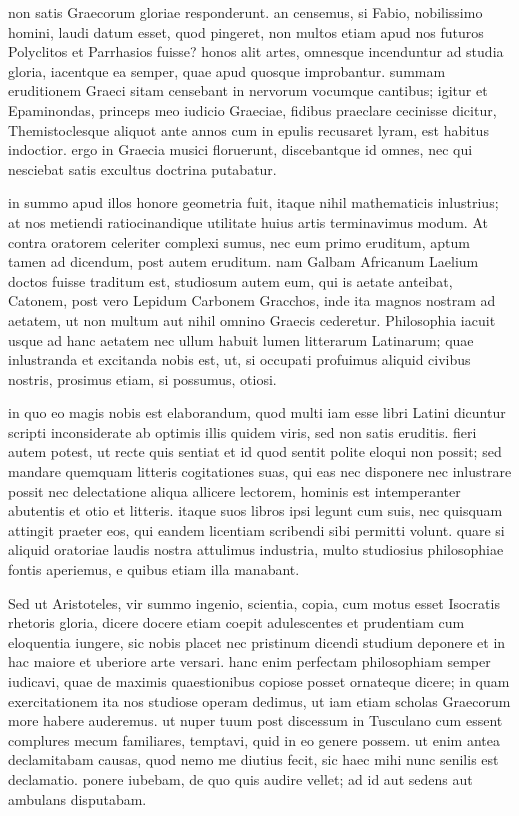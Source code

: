  non satis Graecorum gloriae responderunt. an censemus, si Fabio, nobilissimo homini, laudi datum esset, quod pingeret, non multos etiam apud nos futuros Polyclitos et Parrhasios fuisse? honos alit artes, omnesque incenduntur ad studia gloria, iacentque ea semper, quae apud quosque improbantur. summam eruditionem Graeci sitam censebant in nervorum vocumque cantibus; igitur et Epaminondas, princeps meo iudicio Graeciae, fidibus praeclare cecinisse dicitur, Themistoclesque aliquot ante annos cum in epulis recusaret lyram, est habitus indoctior. ergo in Graecia musici floruerunt, discebantque id omnes, nec qui nesciebat satis excultus doctrina putabatur.

 in summo apud illos honore geometria fuit, itaque nihil mathematicis inlustrius; at nos metiendi ratiocinandique utilitate huius artis terminavimus modum. At contra oratorem celeriter complexi sumus, nec eum primo eruditum, aptum tamen ad dicendum, post autem eruditum. nam Galbam Africanum Laelium doctos fuisse traditum est, studiosum autem eum, qui is aetate anteibat, Catonem, post vero Lepidum Carbonem Gracchos, inde ita magnos nostram ad aetatem, ut non multum aut nihil omnino Graecis cederetur. Philosophia iacuit usque ad hanc aetatem nec ullum habuit lumen litterarum Latinarum; quae inlustranda et excitanda nobis est, ut, si occupati profuimus aliquid civibus nostris, prosimus etiam, si possumus, otiosi.

 in quo eo magis nobis est elaborandum, quod multi iam esse libri Latini dicuntur scripti inconsiderate ab optimis illis quidem viris, sed non satis eruditis. fieri autem potest, ut recte quis sentiat et id quod sentit polite eloqui non possit; sed mandare quemquam litteris cogitationes suas, qui eas nec disponere nec inlustrare possit nec delectatione aliqua allicere lectorem, hominis est intemperanter abutentis et otio et litteris. itaque suos libros ipsi legunt cum suis, nec quisquam attingit praeter eos, qui eandem licentiam scribendi sibi permitti volunt. quare si aliquid oratoriae laudis nostra attulimus industria, multo studiosius philosophiae fontis aperiemus, e quibus etiam illa manabant.

 Sed ut Aristoteles, vir summo ingenio, scientia, copia, cum motus esset Isocratis rhetoris gloria, dicere docere etiam coepit adulescentes et prudentiam cum eloquentia iungere, sic nobis placet nec pristinum dicendi studium deponere et in hac maiore et uberiore arte versari. hanc enim perfectam philosophiam semper iudicavi, quae de maximis quaestionibus copiose posset ornateque dicere; in quam exercitationem ita nos studiose operam dedimus, ut iam etiam scholas Graecorum more habere auderemus. ut nuper tuum post discessum in Tusculano cum essent complures mecum familiares, temptavi, quid in eo genere possem. ut enim antea declamitabam causas, quod nemo me diutius fecit, sic haec mihi nunc senilis est declamatio. ponere iubebam, de quo quis audire vellet; ad id aut sedens aut ambulans disputabam.

